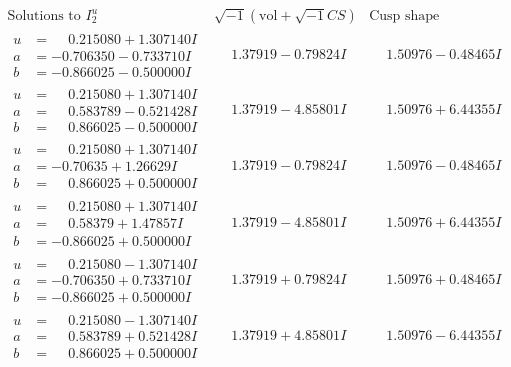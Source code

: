 \documentclass[1p]{elsarticle_modified}
\theoremstyle{definition}
\newcommand{\I}{\sqrt{-1}}
\begin{document}
$$\begin{array}{c|c|c}  
\text{Solutions to }I^u_{2}& \I (\text{vol} + \sqrt{-1}CS) & \text{Cusp shape}\\
 \hline 
\begin{aligned}
u &= \phantom{-}0.215080 + 1.307140 I \\
a &= -0.706350 - 0.733710 I \\
b &= -0.866025 - 0.500000 I\end{aligned}
 & \phantom{-}1.37919 - 0.79824 I & \phantom{-}1.50976 - 0.48465 I \\ \hline\begin{aligned}
u &= \phantom{-}0.215080 + 1.307140 I \\
a &= \phantom{-}0.583789 - 0.521428 I \\
b &= \phantom{-}0.866025 - 0.500000 I\end{aligned}
 & \phantom{-}1.37919 - 4.85801 I & \phantom{-}1.50976 + 6.44355 I \\ \hline\begin{aligned}
u &= \phantom{-}0.215080 + 1.307140 I \\
a &= -0.70635 + 1.26629 I \\
b &= \phantom{-}0.866025 + 0.500000 I\end{aligned}
 & \phantom{-}1.37919 - 0.79824 I & \phantom{-}1.50976 - 0.48465 I \\ \hline\begin{aligned}
u &= \phantom{-}0.215080 + 1.307140 I \\
a &= \phantom{-}0.58379 + 1.47857 I \\
b &= -0.866025 + 0.500000 I\end{aligned}
 & \phantom{-}1.37919 - 4.85801 I & \phantom{-}1.50976 + 6.44355 I \\ \hline\begin{aligned}
u &= \phantom{-}0.215080 - 1.307140 I \\
a &= -0.706350 + 0.733710 I \\
b &= -0.866025 + 0.500000 I\end{aligned}
 & \phantom{-}1.37919 + 0.79824 I & \phantom{-}1.50976 + 0.48465 I \\ \hline\begin{aligned}
u &= \phantom{-}0.215080 - 1.307140 I \\
a &= \phantom{-}0.583789 + 0.521428 I \\
b &= \phantom{-}0.866025 + 0.500000 I\end{aligned}
 & \phantom{-}1.37919 + 4.85801 I & \phantom{-}1.50976 - 6.44355 I \\ \hline\begin{aligned}

\end{aligned}
\end{array}$$
\end{document}
